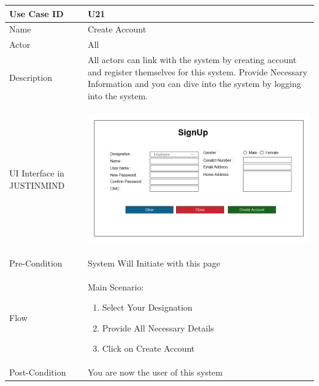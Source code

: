 \documentclass[12pt,a4paper]{report}
\begin{document}
\begin{tabular}{ | m{3cm} | m{12cm}| } \hline

Use Case ID &  U21 \\\hline

Name  	    & Create Account  \\ \hline

Actor     	& All \\ \hline

Description & All actors can link with the system by creating account and register themselves for this system. Provide Necessary Information and you can dive into the system by logging into the system. \\ \hline

UI Interface in JUSTINMIND & \begin{center} \includegraphics[scale=0.3]{./UIs for Latex Reports/UI-004 Create Account@1x.png}\end{center}  \\ \hline

Pre-Condition &  System Will Initiate with this page \\ \hline


Flow & Main Scenario:

\begin{enumerate}
\item   Select Your Designation
\item  Provide All Necessary Details
\item  Click on Create Account


\end{enumerate}

\\ \hline
Post-Condition &  You are now the user of this system  \\ \hline

\end{tabular}
\newpage
\end{document}
